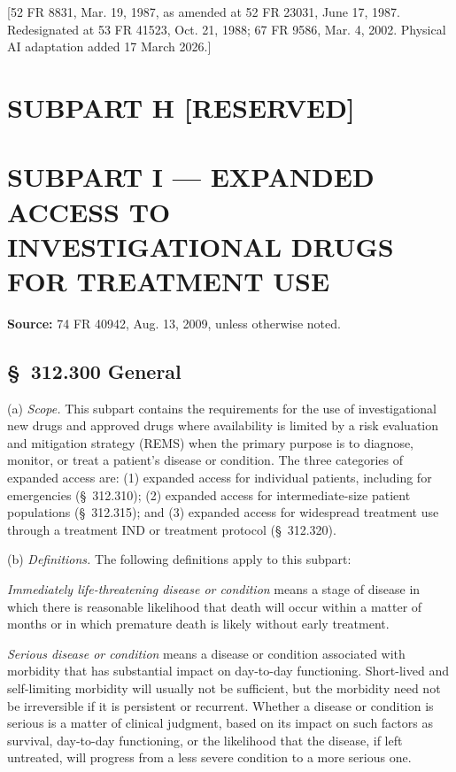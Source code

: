 \documentclass[11pt]{article}
\begin{document}
[52 FR 8831, Mar. 19, 1987, as amended at 52 FR 23031, June 17, 1987. Redesignated at 53 FR 41523, Oct. 21, 1988; 67 FR 9586, Mar. 4, 2002. Physical AI adaptation added 17 March 2026.]

\clearpage

\section{SUBPART H [RESERVED]}

\clearpage

\section{SUBPART I --- EXPANDED ACCESS TO INVESTIGATIONAL DRUGS FOR TREATMENT USE}

\textbf{Source:} 74 FR 40942, Aug. 13, 2009, unless otherwise noted.

\subsection{\S~312.300 General}

(a) \textit{Scope.} This subpart contains the requirements for the use of investigational new drugs and approved drugs where availability is limited by a risk evaluation and mitigation strategy (REMS) when the primary purpose is to diagnose, monitor, or treat a patient's disease or condition. The three categories of expanded access are: (1) expanded access for individual patients, including for emergencies (\S~312.310); (2) expanded access for intermediate-size patient populations (\S~312.315); and (3) expanded access for widespread treatment use through a treatment IND or treatment protocol (\S~312.320).

(b) \textit{Definitions.} The following definitions apply to this subpart:

\begin{description}[leftmargin=0.5cm,style=sameline]
\item[(1)] \textit{Immediately life-threatening disease or condition} means a stage of disease in which there is reasonable likelihood that death will occur within a matter of months or in which premature death is likely without early treatment.
\item[(2)] \textit{Serious disease or condition} means a disease or condition associated with morbidity that has substantial impact on day-to-day functioning. Short-lived and self-limiting morbidity will usually not be sufficient, but the morbidity need not be irreversible if it is persistent or recurrent. Whether a disease or condition is serious is a matter of clinical judgment, based on its impact on such factors as survival, day-to-day functioning, or the likelihood that the disease, if left untreated, will progress from a less severe condition to a more serious one.
\end{description}
\end{document}

